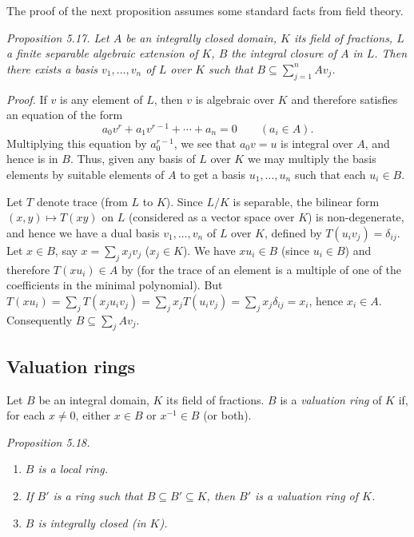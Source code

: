 The proof of the next proposition assumes some standard facts from field theory.

\noindent\textit{Proposition 5.17. Let $A$ be an integrally closed domain, $K$ its field of fractions, $L$ a finite separable algebraic extension of $K$, $B$ the integral closure of $A$ in $L$. Then there exists a basis $v_1,\ldots,v_n$ of $L$ over $K$ such that $B\subseteq\sum_{j=1}^n Av_j$.}

\noindent\textit{Proof.} If $v$ is any element of $L$, then $v$ is algebraic over $K$ and therefore satisfies an equation of the form
\[
 a_0v^r+a_1v^{r-1}+\cdots+a_n=0\qquad(a_i\in A).
\]
Multiplying this equation by $a_0^{r-1}$, we see that $a_0v=u$ is integral over $A$, and hence is in $B$. Thus, given any basis of $L$ over $K$ we may multiply the basis elements by suitable elements of $A$ to get a basis $u_1,\ldots,u_n$ such that each $u_i\in B$.

Let $T$ denote trace (from $L$ to $K$). Since $L/K$ is separable, the bilinear form $(x,y)\mapsto T(xy)$ on $L$ (considered as a vector space over $K$) is non-degenerate, and hence we have a dual basis $v_1,\ldots,v_n$ of $L$ over $K$, defined by $T(u_iv_j)=\delta_{ij}$. Let $x\in B$, say $x=\sum_jx_jv_j$ ($x_j\in K$). We have $xu_i\in B$ (since $u_i\in B$) and therefore $T(xu_i)\in A$ by  (for the trace of an element is a multiple of one of the coefficients in the minimal polynomial). But $T(xu_i)=\sum_jT(x_ju_iv_j)=\sum_jx_jT(u_iv_j)=\sum_jx_j\delta_{ij}=x_i$, hence $x_i\in A$. Consequently $B\subseteq\sum_jAv_j$. \proofbox

\subsection{Valuation rings}

Let $B$ be an integral domain, $K$ its field of fractions. $B$ is a \textit{valuation ring} of $K$ if, for each $x\neq0$, either $x\in B$ or $x^{-1}\in B$ (or both).

\noindent\textit{Proposition 5.18.}
\begin{enumerate}
\renewcommand{\labelenumi}{\roman{enumi})}
\item \textit{$B$ is a local ring.}
\item \textit{If $B'$ is a ring such that $B\subseteq B'\subseteq K$, then $B'$ is a valuation ring of $K$.}
\item \textit{$B$ is integrally closed (in $K$).}
\end{enumerate}

